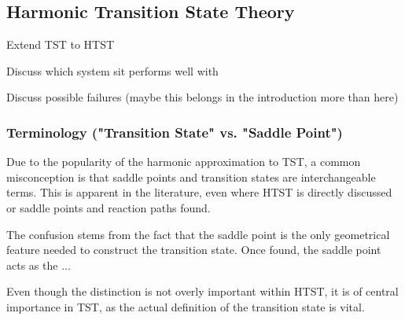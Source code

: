 \subsection{Harmonic Transition State Theory}
\label{sec:htst}


\bit
\item Extend TST to HTST
\item Discuss which system sit performs well with
\item Discuss possible failures (maybe this belongs in the introduction more than here)
\eit

\placeholder

\subsubsection{Terminology ("Transition State" vs. "Saddle Point")}
Due to the popularity of the harmonic approximation to TST, a common misconception is that saddle points and transition states are interchangeable terms.
This is apparent in the literature, even where HTST is directly discussed or saddle points and reaction paths found.

The confusion stems from the fact that the saddle point is the only geometrical feature needed to construct the transition state.
Once found, the saddle point acts as the ... 

Even though the distinction is not overly important within HTST, it is of central importance in TST, as the actual definition of the transition state is vital.

\recent

\incomplete
